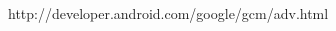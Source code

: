 \documentclass[twoside]{article}
\begin{document}
\begin{multicols}{2}

\begin{thebibliography}{99} %

http://developer.android.com/google/gcm/adv.html
 
\end{thebibliography}


\end{multicols}
\end{document}

